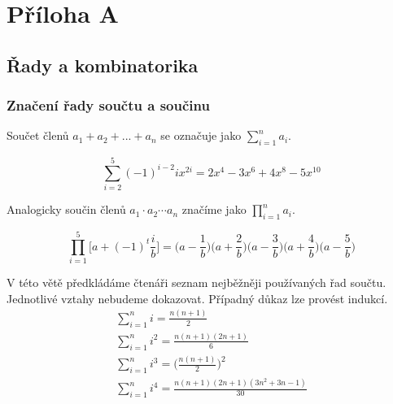 \chapter{Příloha A}

\section{Řady a kombinatorika}

\subsection{Značení řady součtu a součinu}

\begin{definition}
Součet členů $a_1 + a_2 + ... + a_n$ se označuje jako $\sum_{i = 1}^n a_i$.
\end{definition}

\begin{example}
\begin{equation*}
\sum_{i = 2}^5 (-1)^{i - 2}i x^{2i} = 2x^4 - 3 x^6 + 4 x^8 - 5 x^{10}
\end{equation*}
\end{example}

\begin{definition}
Analogicky součin členů $a_1 \cdot a_2 \cdots a_n$ značíme jako $\prod_{i = 1}^n a_i$.
\end{definition}

\begin{example}
\begin{equation*}
\prod_{i = 1}^5 \Big[a + (-1)^t \frac{i}{b} \Big] = \Big(a - \frac{1}{b}\Big)\Big(a + \frac{2}{b}\Big)\Big(a - \frac{3}{b}\Big)\Big(a + \frac{4}{b}\Big)\Big(a - \frac{5}{b}\Big)
\end{equation*}
\end{example}

\begin{theorem}
V této větě předkládáme čtenáři seznam nejběžněji používaných řad součtu. Jednotlivé vztahy nebudeme dokazovat. Případný důkaz lze provést indukcí.
\begin{gather*}
\sum_{i = 1}^n i = \frac{n(n + 1)}{2}\\
\sum_{i = 1}^n i^2 = \frac{n(n + 1)(2n + 1)}{6}\\
\sum_{i = 1}^n i^3 = \Big(\frac{n(n + 1)}{2}\Big)^2\\
\sum_{i = 1}^n i^4 = \frac{n(n + 1)(2n + 1)(3n^2 + 3n - 1)}{30}
\end{gather*}
\end{theorem}

